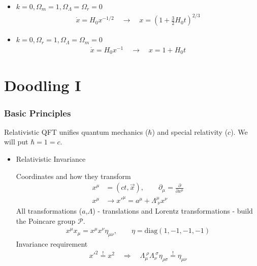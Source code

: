 \documentclass[10pt,a4paper]{book}
\theoremstyle{definition}
\begin{document}
\begin{enumerate}
\begin{itemize}
\item $k=0, \Omega_m=1,\Omega_\Lambda=\Omega_r=0$
\begin{align}
\dot{x}=H_0x^{-1/2}\quad\rightarrow\quad x=\left(1+\frac{3}{2}H_0t\right)^{2/3}
\end{align}

\item $k=0, \Omega_r=1,\Omega_\Lambda=\Omega_m=0$
\begin{align}
\dot{x}=H_0x^{-1}\quad\rightarrow\quad x=1+H_0t
\end{align}


\end{itemize}
\end{enumerate}
\newpage
\chapter{Doodling I}
\subsection{Basic Principles}
Relativistic QFT unifies quantum mechanics ($\hbar$) and special relativity ($c$). We will put $\hbar=1=c$.
\begin{itemize}
\item Relativistic Invariance

Coordinates and how they transform
\begin{align}
x^\mu&=(ct,\vec{x}), \qquad \partial_\mu=\frac{\partial}{\partial x^\mu}\\
x^\mu&\rightarrow x'^{\mu}=a^\mu+\Lambda^\mu_{\;\nu}x^\nu
\end{align}
All transformations ($a$,$\Lambda$) - translations and Lorentz transformations - build the Poincare group $\mathcal{P}$.
\begin{align}
x^\mu x_\mu=x^\mu x^\nu\eta_{\mu\nu}, \qquad \eta=\text{diag}(1,-1,-1,-1)
\end{align}
Invariance requirement
\begin{align}
x'^2\overset{!}{=}x^2\quad\Rightarrow\quad \Lambda_\mu^{\;\rho}\Lambda_\nu^{\;\sigma}\eta_{\rho\sigma}\overset{!}{=}\eta_{\mu\nu}
\end{align}
\end{itemize}
\end{document}
